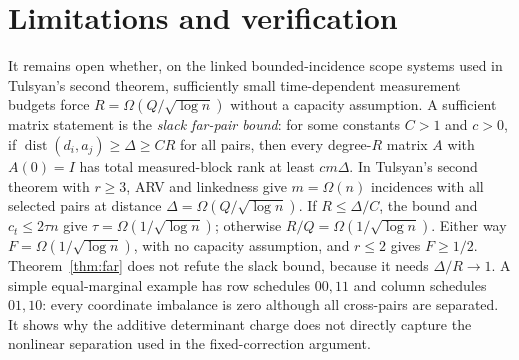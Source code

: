 \documentclass[11pt]{article}
\newcommand{\dist}{\operatorname{dist}}
\begin{document}
\section{Limitations and verification}\label{sec:open}
It remains open whether, on the linked bounded-incidence scope systems used in Tulsyan's second theorem, sufficiently small time-dependent measurement budgets force $R=\Omega(Q/\sqrt{\log n})$ without a capacity assumption. A sufficient matrix statement is the \emph{slack far-pair bound}: for some constants $C>1$ and $c>0$, if $\dist(d_i,a_j)\ge\Delta\ge CR$ for all pairs, then every degree-$R$ matrix $A$ with $A(0)=I$ has total measured-block rank at least $cm\Delta$. In Tulsyan's second theorem with $r\ge3$, ARV and linkedness give $m=\Omega(n)$ incidences with all selected pairs at distance $\Delta=\Omega(Q/\sqrt{\log n})$. If $R\le\Delta/C$, the bound and $c_t\le2\tau n$ give $\tau=\Omega(1/\sqrt{\log n})$; otherwise $R/Q=\Omega(1/\sqrt{\log n})$. Either way $F=\Omega(1/\sqrt{\log n})$, with no capacity assumption, and $r\le2$ gives $F\ge1/2$. Theorem~\ref{thm:far} does not refute the slack bound, because it needs $\Delta/R\to1$. A simple equal-marginal example has row schedules $00,11$ and column schedules $01,10$: every coordinate imbalance is zero although all cross-pairs are separated. It shows why the additive determinant charge does not directly capture the nonlinear separation used in the fixed-correction argument.
\end{document}

